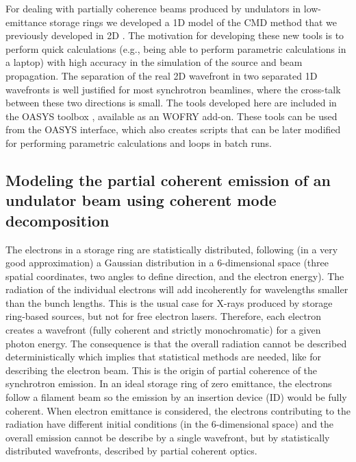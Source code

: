\documentclass{iucr}              %
\begin{document}
For dealing with partially coherence beams produced by undulators in low-emittance storage rings we developed a 1D model of the CMD method that we previously developed in 2D \cite{glass2017}. The motivation for developing these new tools is to perform quick calculations (e.g., being able to perform parametric calculations in a laptop) with high accuracy in the simulation of the source and beam propagation. The separation of the real 2D wavefront in two separated 1D wavefronts is well justified for most synchrotron beamlines, where the cross-talk between these two directions is small. 
The tools developed here are included in the OASYS toolbox \cite{codeOASYS}, available as an WOFRY add-on. These tools can be used from the OASYS interface, which also creates scripts that can be later modified for performing parametric calculations and loops in batch runs. 


\subsection{Modeling the partial coherent emission of an undulator beam using coherent mode decomposition}

The electrons in a storage ring are statistically distributed, following (in a very good approximation) a Gaussian distribution in a 6-dimensional space (three spatial coordinates, two angles to define direction, and the electron energy). The radiation of the individual electrons will add incoherently for wavelengths smaller than the bunch lengths. This is the usual case for X-rays produced by storage ring-based sources, but not for free electron lasers. Therefore, each electron creates a wavefront (fully coherent and strictly monochromatic) for a given photon energy. The consequence is that the overall radiation cannot be described deterministically which implies that statistical methods are needed, like for describing the electron beam. This is the origin of partial coherence of the synchrotron emission. In an ideal storage ring of zero emittance, the electrons follow a filament beam so the emission by an insertion device (ID) would be fully coherent. When electron emittance is considered, the electrons contributing to the radiation have different initial conditions (in the 6-dimensional space) and the overall emission cannot be describe by a single wavefront, but by statistically distributed wavefronts, described by partial coherent optics.
\end{document}
